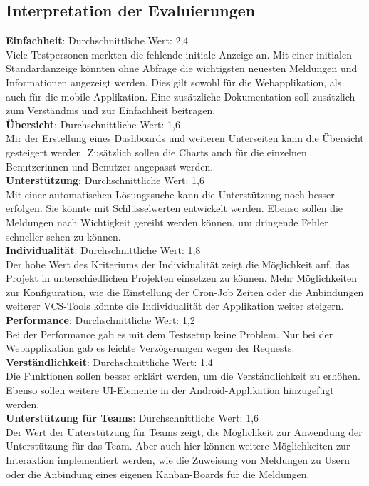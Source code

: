 \subsection{Interpretation der Evaluierungen}
\textbf{Einfachheit}: Durchschnittliche Wert: 2,4\\
Viele Testpersonen merkten die fehlende initiale Anzeige an. Mit einer initialen Standardanzeige könnten ohne Abfrage die wichtigsten neuesten Meldungen und Informationen angezeigt werden. Dies gilt sowohl für die Webapplikation, als auch für die mobile Applikation. Eine zusätzliche Dokumentation soll zusätzlich zum Verständnis und zur Einfachheit beitragen.\\
\textbf{Übersicht}: Durchschnittliche Wert: 1,6\\
Mir der Erstellung eines Dashboards und weiteren Unterseiten kann die Übersicht gesteigert werden. Zusätzlich sollen die Charts auch für die einzelnen Benutzerinnen und Benutzer angepasst werden.\\
\textbf{Unterstützung}: Durchschnittliche Wert: 1,6\\
Mit einer automatischen Lösungssuche kann die Unterstützung noch besser erfolgen. Sie könnte mit Schlüsselwerten entwickelt werden. Ebenso sollen die Meldungen nach Wichtigkeit gereiht werden können, um dringende Fehler schneller sehen zu können. \\
\textbf{Individualität}: Durchschnittliche Wert: 1,8\\
Der hohe Wert des Kriteriums der Individualität zeigt die Möglichkeit auf, das Projekt in unterschiedlichen Projekten einsetzen zu können. Mehr Möglichkeiten zur Konfiguration, wie die Einstellung der Cron-Job Zeiten oder die Anbindungen weiterer VCS-Tools könnte die Individualität der Applikation weiter steigern. \\
\textbf{Performance}: Durchschnittliche Wert: 1,2\\
Bei der Performance gab es mit dem Testsetup keine Problem. Nur bei der Webapplikation gab es leichte Verzögerungen wegen der Requests. \\
\textbf{Verständlichkeit}: Durchschnittliche Wert: 1,4\\
Die Funktionen sollen besser erklärt werden, um die Verständlichkeit zu erhöhen. Ebenso sollen weitere UI-Elemente in der Android-Applikation hinzugefügt werden.\\
\textbf{Unterstützung für Teams}: Durchschnittliche Wert: 1,6\\
Der Wert der Unterstützung für Teams zeigt, die Möglichkeit zur Anwendung der Unterstützung für das Team. Aber auch hier können weitere Möglichkeiten zur Interaktion implementiert werden, wie die Zuweisung von Meldungen zu Usern oder die Anbindung eines eigenen Kanban-Boards für die Meldungen. \\
\chapterend
